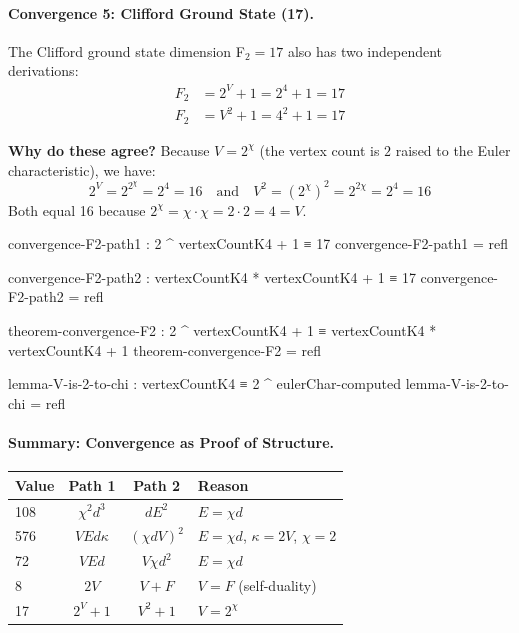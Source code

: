 \documentclass[11pt,a4paper]{book}
\begin{document}
\paragraph{Convergence 5: Clifford Ground State (17).}

The Clifford ground state dimension F$_2 = 17$ also has two independent derivations:
\begin{align}
F_2 &= 2^V + 1 = 2^4 + 1 = 17 \\
F_2 &= V^2 + 1 = 4^2 + 1 = 17
\end{align}

\textbf{Why do these agree?} Because $V = 2^\chi$ (the vertex count is $2$ raised to
the Euler characteristic), we have:
\[
2^V = 2^{2^\chi} = 2^4 = 16 \quad \text{and} \quad V^2 = (2^\chi)^2 = 2^{2\chi} = 2^4 = 16
\]
Both equal 16 because $2^\chi = \chi \cdot \chi = 2 \cdot 2 = 4 = V$.

\begin{code}
convergence-F2-path1 : 2 ^ vertexCountK4 + 1 ≡ 17
convergence-F2-path1 = refl

convergence-F2-path2 : vertexCountK4 * vertexCountK4 + 1 ≡ 17
convergence-F2-path2 = refl

theorem-convergence-F2 : 2 ^ vertexCountK4 + 1 ≡ vertexCountK4 * vertexCountK4 + 1
theorem-convergence-F2 = refl

lemma-V-is-2-to-chi : vertexCountK4 ≡ 2 ^ eulerChar-computed
lemma-V-is-2-to-chi = refl
\end{code}

\paragraph{Summary: Convergence as Proof of Structure.}

\begin{center}
\begin{tabular}{|l|c|c|l|}
\hline
\textbf{Value} & \textbf{Path 1} & \textbf{Path 2} & \textbf{Reason} \\
\hline
108 & $\chi^2 d^3$ & $d E^2$ & $E = \chi d$ \\
576 & $V E d \kappa$ & $(\chi d V)^2$ & $E = \chi d$, $\kappa = 2V$, $\chi = 2$ \\
72 & $V E d$ & $V \chi d^2$ & $E = \chi d$ \\
8 & $2V$ & $V + F$ & $V = F$ (self-duality) \\
17 & $2^V + 1$ & $V^2 + 1$ & $V = 2^\chi$ \\
\hline
\end{tabular}
\end{center}
\end{document}
